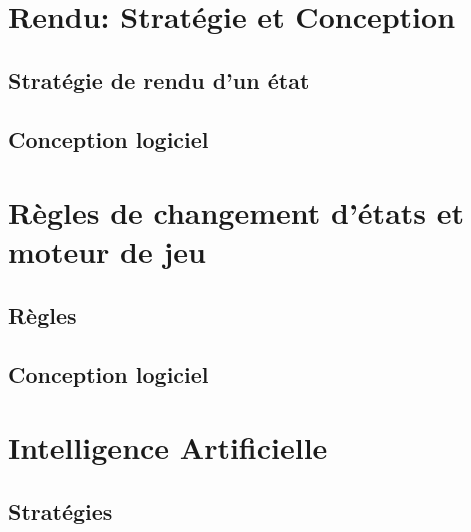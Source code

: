 \documentclass[a4paper,12pt]{article}
\begin{document}
\clearpage
\section{Rendu: Stratégie et Conception}

\subsection{Stratégie de rendu d'un état}


\subsection{Conception logiciel}


\clearpage
\section{Règles de changement d'états et moteur de jeu}

\subsection{Règles}

\clearpage
\subsection{Conception logiciel}




\section{Intelligence Artificielle}

\subsection{Stratégies}
\end{document}
